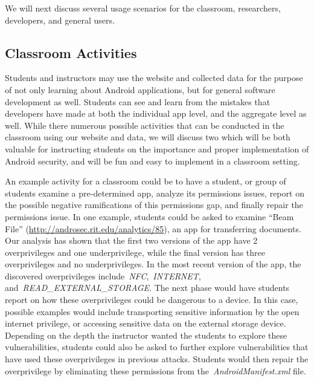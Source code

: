 We will next discuss several usage scenarios for the classroom, researchers, developers, and general users.




\subsection{Classroom Activities} %

Students and instructors may use the website and collected data for the purpose of not only learning about Android applications, but for general software development as well. Students can see and learn from the mistakes that developers have made at both the individual app level, and the aggregate level as well. While there numerous possible activities that can be conducted in the classroom using our website and data, we will discuss two which will be both valuable for instructing students on the importance and proper implementation of Android security, and will be fun and easy to implement in a classroom setting.





An example activity for a classroom could be to have a student, or group of students examine a pre-determined app, analyze its permissions issues, report on the possible negative ramifications of this permissions gap, and finally repair the permissions issue. In one example, students could be asked to examine ``Beam File'' (\url{http://androsec.rit.edu/analytics/85}), an app for transferring documents. Our analysis has shown that the first two versions of the app have 2 overprivileges and one underprivilege, while the final version has three overprivileges and no underprivileges. In the most recent version of the app, the discovered overprivileges include~\emph{NFC},~\emph{INTERNET}, and~\emph{READ\_EXTERNAL\_STORAGE}. The next phase would have students report on how these overprivileges could be dangerous to a device. In this case, possible examples would include transporting sensitive information by the open internet privilege, or accessing sensitive data on the external storage device. Depending on the depth the instructor wanted the students to explore these vulnerabilities, students could also be asked to further explore vulnerabilities that have used these overprivileges in previous attacks. Students would then repair the overprivilege by eliminating these permissions from the~\emph{AndroidManifest.xml} file.


